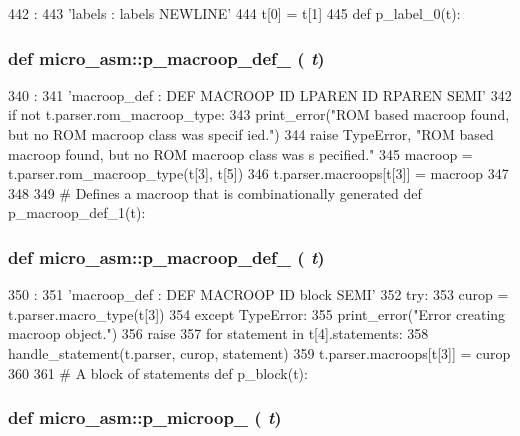 \begin{DoxyCode}
442                  :
443     'labels : labels NEWLINE'
444     t[0] = t[1]
445 
def p_label_0(t):
\end{DoxyCode}
\hypertarget{namespacemicro__asm_aa06e96f1559d9d801fc212792e8b6f9a}{
\subsubsection[{p\_\-macroop\_\-def\_\-0}]{\setlength{\rightskip}{0pt plus 5cm}def micro\_\-asm::p\_\-macroop\_\-def\_ ( {\em t})}}
\label{namespacemicro__asm_aa06e96f1559d9d801fc212792e8b6f9a}



\begin{DoxyCode}
340                       :
341     'macroop_def : DEF MACROOP ID LPAREN ID RPAREN SEMI'
342     if not t.parser.rom_macroop_type:
343         print_error("ROM based macroop found, but no ROM macroop class was specif
      ied.")
344         raise TypeError, "ROM based macroop found, but no ROM macroop class was s
      pecified."
345     macroop = t.parser.rom_macroop_type(t[3], t[5])
346     t.parser.macroops[t[3]] = macroop
347 
348 
349 # Defines a macroop that is combinationally generated
def p_macroop_def_1(t):
\end{DoxyCode}
\hypertarget{namespacemicro__asm_a6d0e75a8c27d4a8f7e9bd8d1e20459b6}{
\subsubsection[{p\_\-macroop\_\-def\_\-1}]{\setlength{\rightskip}{0pt plus 5cm}def micro\_\-asm::p\_\-macroop\_\-def\_ ( {\em t})}}
\label{namespacemicro__asm_a6d0e75a8c27d4a8f7e9bd8d1e20459b6}



\begin{DoxyCode}
350                       :
351     'macroop_def : DEF MACROOP ID block SEMI'
352     try:
353         curop = t.parser.macro_type(t[3])
354     except TypeError:
355         print_error("Error creating macroop object.")
356         raise
357     for statement in t[4].statements:
358         handle_statement(t.parser, curop, statement)
359     t.parser.macroops[t[3]] = curop
360 
361 # A block of statements
def p_block(t):
\end{DoxyCode}
\hypertarget{namespacemicro__asm_a0f05ebd0fd8134f90eab4087d7e71fb2}{
\subsubsection[{p\_\-microop\_\-0}]{\setlength{\rightskip}{0pt plus 5cm}def micro\_\-asm::p\_\-microop\_ ( {\em t})}}
\label{namespacemicro__asm_a0f05ebd0fd8134f90eab4087d7e71fb2}



